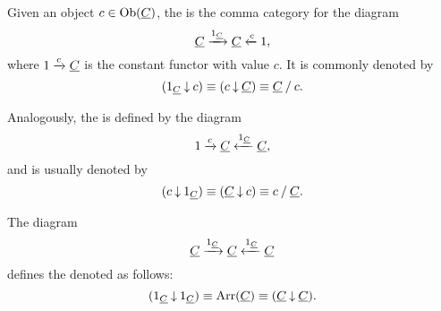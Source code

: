 \begin{examples*}
	\item Given an object \( c \in \Ob(\C) \), the  is the comma category for the diagram
		\[
			\C \tox{1_{\C}} \C \otx{c} 1,
		\]
		where \( 1 \tox{c} \C \) is the constant functor with value \( c \). It is commonly denoted by
		\[
			(1_{\C} \comma c) \equiv (c \comma \C) \equiv \C \slice c.
		\]
	\item Analogously, the  is defined by the diagram
		\[
			1 \tox{c} \C \otx{1_{\C}} \C,
		\]
		and is usually denoted by
		\[
			(c \comma 1_{\C}) \equiv (\C \comma c) \equiv c \slice \C.
		\]
	\item The diagram
		\[
			\C \tox{1_{\C}} \C \otx{1_{\C}} \C
		\]
		defines the  denoted as follows:
		\[
			(1_{\C} \comma 1_{\C}) \equiv \Arr(\C) \equiv (\C \comma \C).
		\]
\end{examples*}